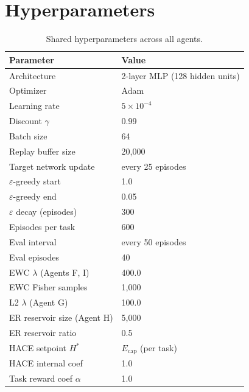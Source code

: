 \documentclass{article}
\newcommand{\setpoint}{H^*}
\newcommand{\energy}{E}
\begin{document}
\section*{Hyperparameters}
\label{app:hyperparams}

\begin{table}[h]
\centering
\caption{Shared hyperparameters across all agents.}
\small
\begin{tabular}{@{}ll@{}}
\toprule
\textbf{Parameter} & \textbf{Value} \\
\midrule
Architecture & 2-layer MLP (128 hidden units) \\
Optimizer & Adam \\
Learning rate & $5 \times 10^{-4}$ \\
Discount $\gamma$ & 0.99 \\
Batch size & 64 \\
Replay buffer size & 20{,}000 \\
Target network update & every 25 episodes \\
$\varepsilon$-greedy start & 1.0 \\
$\varepsilon$-greedy end & 0.05 \\
$\varepsilon$ decay (episodes) & 300 \\
Episodes per task & 600 \\
Eval interval & every 50 episodes \\
Eval episodes & 40 \\
\midrule
EWC $\lambda$ (Agents F, I) & 400.0 \\
EWC Fisher samples & 1{,}000 \\
L2 $\lambda$ (Agent G) & 100.0 \\
ER reservoir size (Agent H) & 5{,}000 \\
ER reservoir ratio & 0.5 \\
HACE setpoint $\setpoint$ & $\energy_{\text{cap}}$ (per task) \\
HACE internal coef & 1.0 \\
Task reward coef $\alpha$ & 1.0 \\
\bottomrule
\end{tabular}
\end{table}
\end{document}
